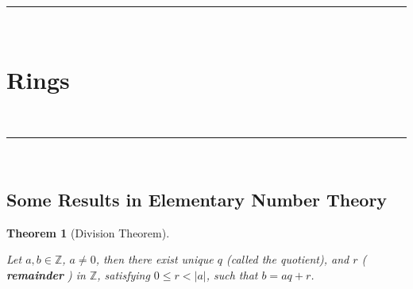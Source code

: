\documentclass[a4paper,12pt]{report}
\newcommand{\abs}[1]{\left|#1\right|}
\newcounter{statement}
\numberwithin{statement}{chapter}
\newtheorem{thm}[statement]{Theorem}
\numberwithin{equation}{chapter}
\numberwithin{section}{chapter}
\numberwithin{subsection}{section}
\begin{document}
\quad\\\hrule
\quad\\
\section*{Rings}

\quad\\\hrule
\quad\\
\subsection*{Some Results in Elementary Number Theory}




\begin{thm}[Division Theorem]

\label{thm:divalg}



Let $a, b \in \mathbb{Z}$, $a \neq 0$,
then there exist unique $q$ (called the quotient), and $r$ ( {\bf remainder} ) in $\mathbb{Z}$, satisfying
$0 \leq r < \abs{a}$, such that $b = aq + r$.
\end{thm}
\end{document}
